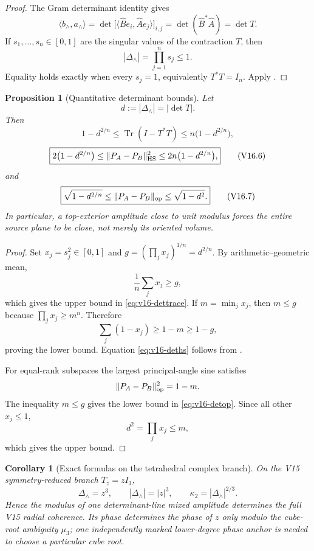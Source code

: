 \documentclass[11pt]{article}
\newtheorem{proposition}[proposition]{Proposition}
\newtheorem{corollary}[corollary]{Corollary}
\theoremstyle{definition}
\theoremstyle{remark}
\newcommand{\Tr}{\operatorname{Tr}}
\begin{document}
\begin{proof}
The Gram determinant identity gives
\[
 \langle b_\wedge,a_\wedge\rangle
 =\det\bigl[\langle\widehat B e_i,\widehat A e_j\rangle\bigr]_{i,j}
 =\det(\widehat B^*\widehat A)
 =\det T.
\]
If $s_1,\ldots,s_n\in[0,1]$ are the singular values of the contraction $T$,
then
\[
 |\Delta_\wedge|=\prod_{j=1}^n s_j\le1.
\]
Equality holds exactly when every $s_j=1$, equivalently $T^*T=I_n$.
Apply .
\end{proof}

\begin{proposition}[Quantitative determinant bounds]
\label{prop:v16-det-bounds}
Let
\[
 d:=|\Delta_\wedge|=|\det T|.
\]
Then
\[
 \boxed{
 1-d^{2/n}
 \le
 \Tr(I-T^*T)
 \le
 n\bigl(1-d^{2/n}\bigr),}
 \tag{V16.5}\label{eq:v16-dettrace}
\]
\[
 \boxed{
 2\bigl(1-d^{2/n}\bigr)
 \le
 \|P_A-P_B\|_{\rm HS}^2
 \le
 2n\bigl(1-d^{2/n}\bigr),}
 \tag{V16.6}\label{eq:v16-deths}
\]
and
\[
 \boxed{
 \sqrt{1-d^{2/n}}
 \le
 \|P_A-P_B\|_{\rm op}
 \le
 \sqrt{1-d^2}.}
 \tag{V16.7}\label{eq:v16-detop}
\]
In particular, a top-exterior amplitude close to unit modulus forces the
entire source plane to be close, not merely its oriented volume.
\end{proposition}

\begin{proof}
Set $x_j=s_j^2\in[0,1]$ and
$g=(\prod_jx_j)^{1/n}=d^{2/n}$.  By arithmetic--geometric mean,
\[
 \frac1n\sum_jx_j\ge g,
\]
which gives the upper bound in \eqref{eq:v16-dettrace}.  If
$m=\min_jx_j$, then $m\le g$ because
$\prod_jx_j\ge m^n$.  Therefore
\[
 \sum_j(1-x_j)\ge1-m\ge1-g,
\]
proving the lower bound.  Equation \eqref{eq:v16-deths} follows from
.

For equal-rank subspaces the largest principal-angle sine satisfies
\[
 \|P_A-P_B\|_{\rm op}^2=1-m.
\]
The inequality $m\le g$ gives the lower bound in \eqref{eq:v16-detop}.  Since all
other $x_j\le1$,
\[
 d^2=\prod_jx_j\le m,
\]
which gives the upper bound.
\end{proof}

\begin{corollary}[Exact formulas on the tetrahedral complex branch]
\label{cor:v16-det-disk}
On the V15 symmetry-reduced branch $T_z=zI_3$,
\[
 \boxed{
 \Delta_\wedge=z^3,
 \qquad
 |\Delta_\wedge|=|z|^3,
 \qquad
 \kappa_2=|\Delta_\wedge|^{2/3}.}
 \tag{V16.8}
\]
Hence the modulus of one determinant-line mixed amplitude determines the full
V15 radial coherence.  Its phase determines the phase of $z$ only modulo the
cube-root ambiguity $\mu_3$; one independently marked lower-degree phase
anchor is needed to choose a particular cube root.
\end{corollary}
\end{document}
